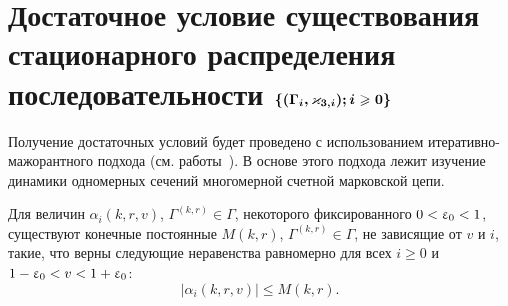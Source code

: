 \section[Достаточное условие существования стационарного {распределения} последовательности $\MarkThree$]%
{ Достаточное условие существования стационарного {распределения} последовательности $\boldsymbol{\MarkThree}$}
Получение достаточных условий будет проведено с использованием итеративно-мажорантного подхода (см. работы~\cite{Fedotkin:1988, Fedotkin:1989}). В основе этого подхода лежит изучение динамики одномерных сечений многомерной счетной марковской цепи. 
\begin{lemma}
Для величин $\alpha_i(k, r, v)$,  $\Gamma^{(k, r)} \in \Gamma$,  некоторого фиксированного $0 \hm< \varepsilon_0 < 1$,  существуют конечные постоянные $M(k, r)$,  $\Gamma^{(k, r)}\in \Gamma$,  не зависящие от $v$ и $i$,  такие,  что верны следующие неравенства равномерно для всех $i \geqslant 0$ и $ 1-\varepsilon_0 < v \hm< 1  + \varepsilon_0$:
\begin{equation}
|\alpha_i(k, r, v)| \leqslant M(k, r).
\end{equation}

\end{lemma}
